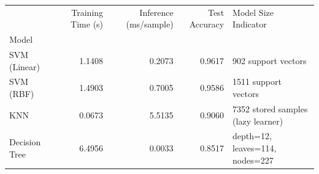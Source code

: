 \begin{tabular}{lrrrl}
\toprule
 & Training Time (s) & Inference (ms/sample) & Test Accuracy & Model Size Indicator \\
Model &  &  &  &  \\
\midrule
SVM (Linear) & 1.1408 & 0.2073 & 0.9617 & 902 support vectors \\
SVM (RBF) & 1.4903 & 0.7005 & 0.9586 & 1511 support vectors \\
KNN & 0.0673 & 5.5135 & 0.9060 & 7352 stored samples (lazy learner) \\
Decision Tree & 6.4956 & 0.0033 & 0.8517 & depth=12, leaves=114, nodes=227 \\
\bottomrule
\end{tabular}
